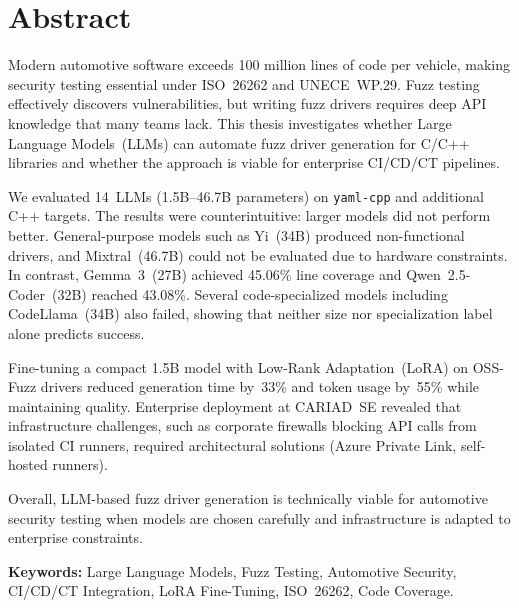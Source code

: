 \chapter*{Abstract}

Modern automotive software exceeds 100 million lines of code per vehicle, making security testing essential under ISO~26262 and UNECE~WP.29. Fuzz testing effectively discovers vulnerabilities, but writing fuzz drivers requires deep API knowledge that many teams lack. This thesis investigates whether Large Language Models~(LLMs) can automate fuzz driver generation for C/C++ libraries and whether the approach is viable for enterprise CI/CD/CT pipelines.

We evaluated 14~LLMs (1.5B--46.7B parameters) on \texttt{yaml-cpp} and additional C++ targets. The results were counterintuitive: larger models did not perform better. General-purpose models such as Yi~(34B) produced non-functional drivers, and Mixtral~(46.7B) could not be evaluated due to hardware constraints. In contrast, Gemma~3~(27B) achieved 45.06\% line coverage and Qwen~2.5-Coder~(32B) reached 43.08\%. Several code-specialized models including CodeLlama~(34B) also failed, showing that neither size nor specialization label alone predicts success.

Fine-tuning a compact 1.5B model with Low-Rank Adaptation~(LoRA) on OSS-Fuzz drivers reduced generation time by~33\% and token usage by~55\% while maintaining quality. Enterprise deployment at CARIAD~SE revealed that infrastructure challenges, such as corporate firewalls blocking API calls from isolated CI runners, required architectural solutions (Azure Private Link, self-hosted runners).

Overall, LLM-based fuzz driver generation is technically viable for automotive security testing when models are chosen carefully and infrastructure is adapted to enterprise constraints.

\vspace{0.5cm}
\noindent \textbf{Keywords:} Large Language Models, Fuzz Testing, Automotive Security, CI/CD/CT Integration, LoRA Fine-Tuning, ISO~26262, Code Coverage.